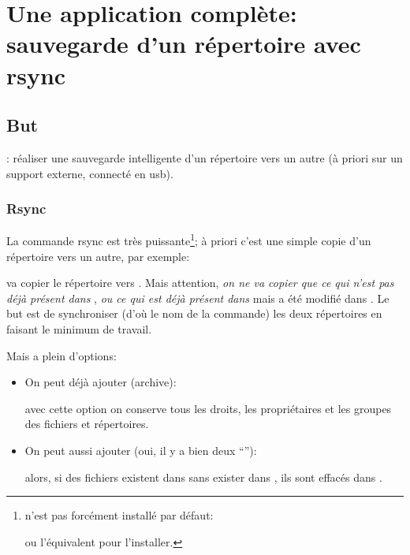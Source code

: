 \section{Une application complète: sauvegarde d'un répertoire avec
  rsync}



\subsection*{But}: réaliser une sauvegarde \og intelligente \fg{} d'un
répertoire vers un autre (à priori sur un support externe, connecté en
usb).

\subsubsection*{Rsync} La commande rsync est très
puissante\footnote{ n'est pas forcément installé par
  défaut:


  ou l'équivalent pour l'installer.}; à priori
c'est une simple copie d'un répertoire vers un autre, par exemple:


va copier le répertoire  vers . Mais
attention, \emph{on ne va copier que ce qui n'est pas déjà présent dans}
, \emph{ou ce qui est déjà présent dans} 
 {mais a été modifié dans}
.  Le but est de synchroniser (d'où le nom de la
commande) les deux répertoires en  faisant le minimum de travail.

Mais  a plein d'options:

\begin{itemize}
\item On peut déjà ajouter  (archive):
  

  avec cette option on conserve tous les droits, les propriétaires et
  les groupes des fichiers et répertoires.

\item On peut aussi ajouter  (oui, il y a bien
  deux ``\ttt{-}''): 


  alors, si des fichiers existent dans  sans exister
  dans , ils sont effacés dans .
\end{itemize}
  
